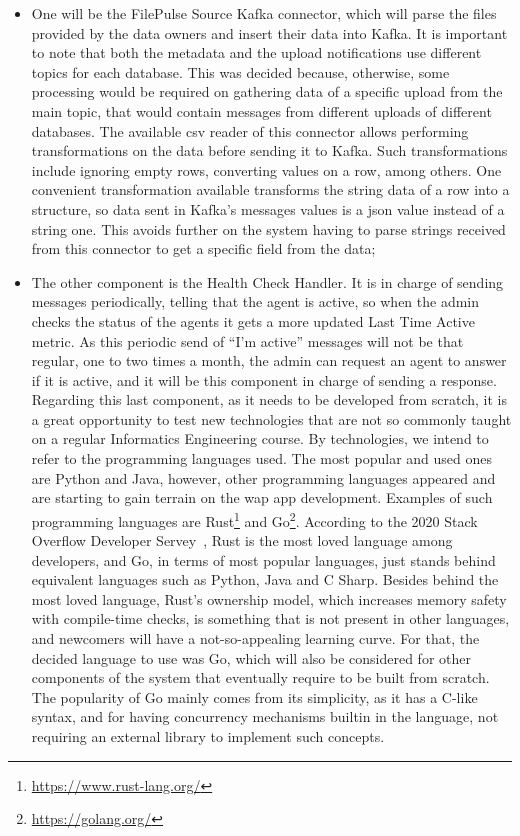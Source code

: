 \begin{itemize}
    \item One will be the FilePulse Source Kafka connector, which will parse the files provided by the data owners and insert their data into Kafka.
        It is important to note that both the metadata and the upload notifications use different topics for each database.
        This was decided because, otherwise, some processing would be required on gathering data of a specific upload from the main topic, that would contain messages from different uploads of different databases.
        The available \gls{csv} reader of this connector allows performing transformations on the data before sending it to Kafka.
        Such transformations include ignoring empty rows, converting values on a row, among others.
        One convenient transformation available transforms the string data of a row into a structure, so data sent in Kafka's messages values is a \gls{json} value instead of a string one.
        This avoids further on the system having to parse strings received from this connector to get a specific field from the data;

    \item The other component is the Health Check Handler.
        It is in charge of sending messages periodically, telling that the agent is active, so when the admin checks the status of the agents it gets a more updated Last Time Active metric.
        As this periodic send of ``I'm active'' messages will not be that regular, one to two times a month, the admin can request an agent to answer if it is active, and it will be this component in charge of sending a response.
        Regarding this last component, as it needs to be developed from scratch, it is a great opportunity to test new technologies that are not so commonly taught on a regular Informatics Engineering course.
        By technologies, we intend to refer to the programming languages used.
        The most popular and used ones are Python and Java, however, other programming languages appeared and are starting to gain terrain on the wap app development.
        Examples of such programming languages are Rust\footnote{\url{https://www.rust-lang.org/}} and Go\footnote{\url{https://golang.org/}}.
        According to the 2020 Stack Overflow Developer Servey~\cite{so-survey}, Rust is the most loved language among developers, and Go, in terms of most popular languages, just stands behind equivalent languages such as Python, Java and C Sharp.
        Besides behind the most loved language, Rust's ownership model, which increases memory safety with compile-time checks, is something that is not present in other languages, and newcomers will have a not-so-appealing learning curve.
        For that, the decided language to use was Go, which will also be considered for other components of the system that eventually require to be built from scratch.
        The popularity of Go mainly comes from its simplicity, as it has a C-like syntax, and for having concurrency mechanisms builtin in the language, not requiring an external library to implement such concepts.
\end{itemize}


